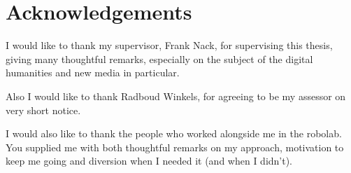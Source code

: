 \section{Acknowledgements}


I would like to thank my supervisor, Frank Nack, for supervising this thesis,
giving many thoughtful remarks, especially on the subject of the digital
humanities and new media in particular.

Also I would like to thank Radboud Winkels, for agreeing to be my assessor
on very short notice.

I would also like to thank the people who worked alongside me in the robolab. You
supplied me with both thoughtful remarks on my approach, motivation to keep me
going and diversion when I needed it (and when I didn't).
